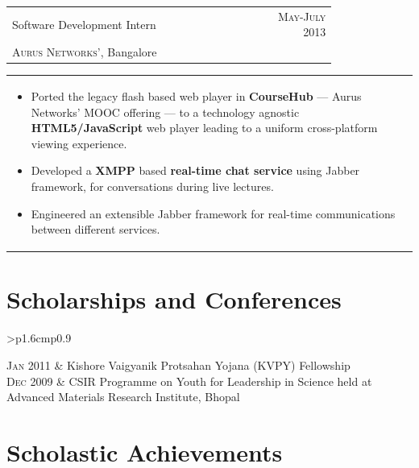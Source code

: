 \documentclass[a4paper,10pt]{article} %
\newcommand{\cproject}[5]{
    \begin{tabular}{p{0.80\linewidth}r}
        \textcolor{NavyBlue}{#2} & \multicolumn{1}{m{4cm}}{\raggedleft \textsc{#1}}\\
        #3 & #4
    \end{tabular}
    \begin{tabular}{p{\linewidth}}
    \vspace{-0.3cm}
        \footnotesize{#5}
    \end{tabular}
    \vspace{-0.5cm}
}
\newcommand{\itemlist}[1]{
    \begin{tabular}{>{\raggedleft}p{1.6cm}p{0.9\linewidth}}
        #1
    \end{tabular}
}
\begin{document}
\cproject
    {May-July 2013}
    {Software Development Intern}
    {\textsc{Aurus Networks'}, Bangalore}
    {}
    {
        \begin{itemize}[leftmargin=0.5cm]
            \item Ported the legacy flash based web player in \textbf{CourseHub} --- Aurus Networks'
                MOOC offering --- to a technology agnostic \textbf{HTML5/JavaScript} web player leading
                to a uniform cross-platform viewing experience.
            \item Developed a \textbf{XMPP} based \textbf{real-time chat service} using Jabber framework,
                for conversations during live lectures.
            \item Engineered an extensible Jabber framework for real-time communications between different services.
        \end{itemize}
    }

\section{Scholarships and Conferences}

\itemlist {
    \textsc{Jan 2011} & Kishore Vaigyanik Protsahan Yojana (KVPY) Fellowship \\
    \textsc{Dec 2009} & CSIR Programme on Youth for Leadership in Science held at Advanced Materials Research Institute, Bhopal\\
}

\section{Scholastic Achievements}
\end{document}
